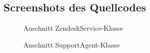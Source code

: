 \subsection{Screenshots des Quellcodes}
\label{Screenshots}
\vspace{20mm}
\begin{figure}[htb]
\centering
{}
\caption{Auschnitt ZendeskService-Klasse}
\end{figure}
\clearpage
\vspace{20mm}
\begin{figure}[htb]
\centering
{}
\caption{Auschnitt SupportAgent-Klasse}
\end{figure}
\clearpage
